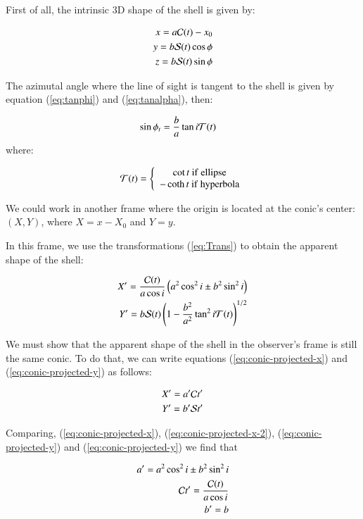 First of all, the intrinsic 3D shape of the shell is given by:

\begin{align}
x = a\mathcal{C}(t)-x_0 \\ 
y = b\mathcal{S}(t)\cos\phi \\
z =  b\mathcal{S}(t)\sin\phi
\end{align}

The azimutal angle where the line of sight is tangent to the shell is given by equation (\ref{eq:tanphi}) and (\ref{eq:tanalpha}), then:

\begin{align}
\sin\phi_t &= \frac{b}{a}\tan i\mathcal{T}(t) 
\end{align}
where:

\begin{align}
\mathcal{T}(t) = \left\lbrace \begin{array}{c}
\cot t ~\mathrm{if~ellipse} \\
-\coth t ~\mathrm{if~hyperbola}
\end{array}\right.
\end{align}

We could work in another frame   where the origin is located at the conic's center: $(X,Y)$, where $X=x-X_0$ and $Y=y$.

In this frame,  we use the transformations (\ref{eq:Trans})  to obtain the apparent shape of the shell:

\begin{align}
X' = \frac{\mathcal{C}(t)}{a\cos i}\left(a^2\cos^2 i \pm b^2\sin^2 i\right)  \label{eq:conic-projected-x}\\
Y'= b\mathcal{S}(t)\left(1-\frac{b^2}{a^2}\tan^2 i\mathcal{T}(t)\right)^{1/2}
\label{eq:conic-projected-y}
\end{align}


We must show that the apparent shape of the shell in the observer's frame is still the same conic. To do that, we can write equations
(\ref{eq:conic-projected-x}) and (\ref{eq:conic-projected-y}) as follows:

\begin{align}
X' = a'\mathcal{C} t' \label{eq:conic-projected-x-2} \\
Y' = b'\mathcal{S} t' \label{eq:conic-projected-y-2}
\end{align}

Comparing, (\ref{eq:conic-projected-x}), (\ref{eq:conic-projected-x-2}), (\ref{eq:conic-projected-y}) and (\ref{eq:conic-projected-y}) we find that

\begin{align}
a' = a^2\cos^2 i \pm b^2\sin^2 i \\
\mathcal{C} t' = \frac{\mathcal{C}(t)}{a\cos i} \\
b' = b
\end{align} 

